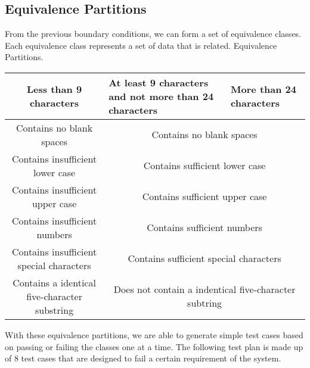 \documentclass[12pt,letterpaper]{article}
\begin{document}
\subsection{Equivalence Partitions}

From the previous boundary conditions, we can form a set of equivalence classes. Each equivalence
class represents a set of data that is related.
\centering Equivalence Partitions.

\begin{center}

    
  \begin{tabular}{||c|m{4cm}|m{5cm}||}
  \hline
  Less than 9 characters & At least 9 characters and not more than 24
  characters & More than 24 characters \\
  
  \hline \hline
  \multicolumn{1}{||c|}{Contains no blank spaces} & \multicolumn{2}{c||}{Contains no blank spaces} \\
  
  \hline \hline
  \multicolumn{1}{||c|}{Contains insufficient lower case} 
  & \multicolumn{2}{c||}{Contains sufficient lower case} \\
    
  \hline \hline
  \multicolumn{1}{||c|}{Contains insufficient upper case} 
  & \multicolumn{2}{c||}{Contains sufficient upper case} \\
  
  \hline \hline
  \multicolumn{1}{||c|}{Contains insufficient numbers} 
  & \multicolumn{2}{c||}{Contains sufficient numbers} \\
    
  \hline \hline
  \multicolumn{1}{||c|}{Contains insufficient special characters} 
  & \multicolumn{2}{c||}{Contains sufficient special characters} \\
  
  \hline \hline
  \multicolumn{1}{||c|}{Contains a identical five-character substring}
  & \multicolumn{2}{c||}{Does not contain a indentical five-character subtring} \\
  \hline
  \end{tabular}
\end{center}


With these equivalence partitions, we are able to generate simple test cases
based on passing or failing the classes one at a time. The following test plan
is made up of 8 test cases that are designed to fail a certain requirement of
the system.
\newline
\end{document}
